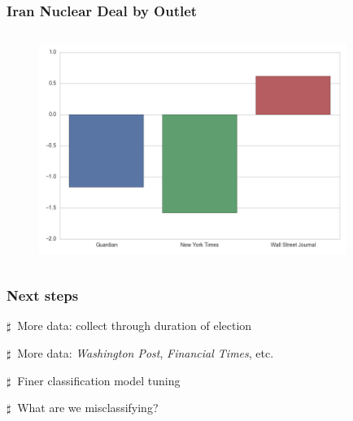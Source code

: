 \documentclass[11pt]{beamer}
\newenvironment{innerlist}[1][\enskip\textbullet]%
        {\begin{compactenum}[#1]}{\end{compactenum}}
\begin{document}
\begin{frame}
\frametitle{Iran Nuclear Deal by Outlet}

\begin{figure}
\centering
\includegraphics[width=100mm,height=75mm]{figures/source_sentiment_topic3.png}
\end{figure} 

\end{frame}


\begin{frame}
\frametitle{Next steps}

\vspace{5mm}

\begin{innerlist}
	\item[$\sharp~$] More data: collect through duration of election
	\vspace{4mm}
	\item[$\sharp~$] More data: {\it Washington Post}, {\it Financial Times}, etc.
	\vspace{4mm}
	\item[$\sharp~$] Finer classification model tuning 
	\vspace{4mm}
	\item[$\sharp~$] What are we misclassifying? 
\end{innerlist}

\end{frame}

\end{document}

